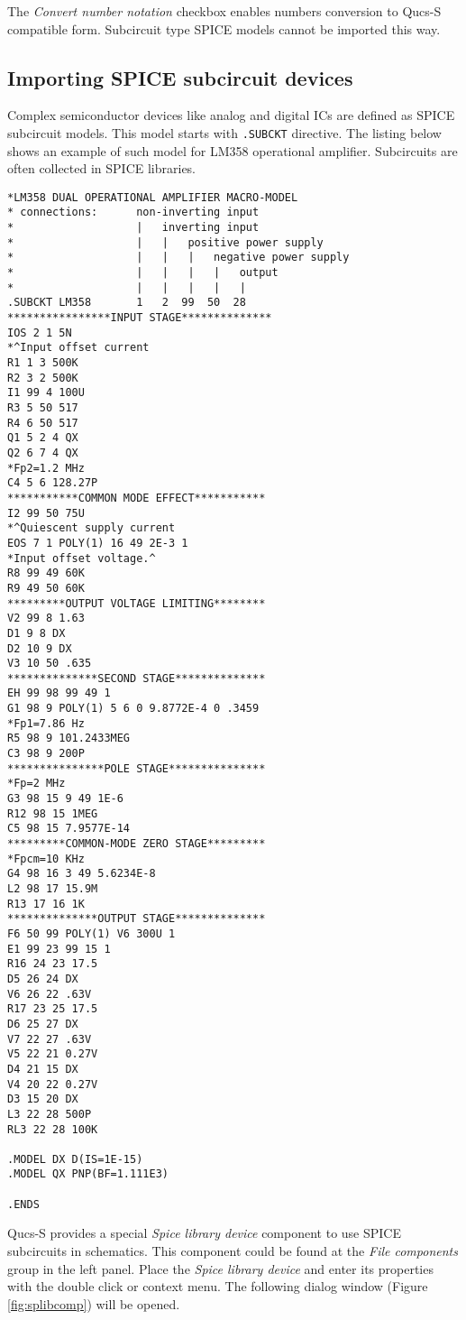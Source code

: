 The \emph{Convert number notation} checkbox enables numbers conversion to Qucs-S compatible form. Subcircuit type SPICE models cannot be imported this way.

\subsection{Importing SPICE subcircuit devices}

Complex semiconductor devices like analog and digital ICs are defined as SPICE subcircuit models. This model starts with \verb|.SUBCKT| directive. The listing below shows an example of such model for LM358 operational amplifier. Subcircuits are often collected in SPICE libraries.

\begin{verbatim}
*LM358 DUAL OPERATIONAL AMPLIFIER MACRO-MODEL
* connections:      non-inverting input
*                   |   inverting input
*                   |   |   positive power supply
*                   |   |   |   negative power supply
*                   |   |   |   |   output
*                   |   |   |   |   |
.SUBCKT LM358       1   2  99  50  28
****************INPUT STAGE**************
IOS 2 1 5N
*^Input offset current
R1 1 3 500K
R2 3 2 500K
I1 99 4 100U
R3 5 50 517
R4 6 50 517
Q1 5 2 4 QX
Q2 6 7 4 QX
*Fp2=1.2 MHz
C4 5 6 128.27P
***********COMMON MODE EFFECT***********
I2 99 50 75U
*^Quiescent supply current
EOS 7 1 POLY(1) 16 49 2E-3 1
*Input offset voltage.^
R8 99 49 60K
R9 49 50 60K
*********OUTPUT VOLTAGE LIMITING********
V2 99 8 1.63
D1 9 8 DX
D2 10 9 DX
V3 10 50 .635
**************SECOND STAGE**************
EH 99 98 99 49 1
G1 98 9 POLY(1) 5 6 0 9.8772E-4 0 .3459
*Fp1=7.86 Hz
R5 98 9 101.2433MEG
C3 98 9 200P
***************POLE STAGE***************
*Fp=2 MHz
G3 98 15 9 49 1E-6
R12 98 15 1MEG
C5 98 15 7.9577E-14
*********COMMON-MODE ZERO STAGE*********
*Fpcm=10 KHz
G4 98 16 3 49 5.6234E-8
L2 98 17 15.9M
R13 17 16 1K
**************OUTPUT STAGE**************
F6 50 99 POLY(1) V6 300U 1
E1 99 23 99 15 1
R16 24 23 17.5
D5 26 24 DX
V6 26 22 .63V
R17 23 25 17.5
D6 25 27 DX
V7 22 27 .63V
V5 22 21 0.27V
D4 21 15 DX
V4 20 22 0.27V
D3 15 20 DX
L3 22 28 500P
RL3 22 28 100K

.MODEL DX D(IS=1E-15)
.MODEL QX PNP(BF=1.111E3)

.ENDS
\end{verbatim}

Qucs-S provides a special \emph{Spice library device} component to use SPICE subcircuits in schematics. This component could be found at the \emph{File components} group in the left panel. Place the \emph{Spice library device} and enter its properties with the double click or context menu. The following dialog window (Figure \ref{fig:splibcomp}) will be opened.


